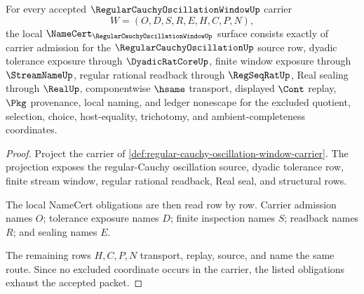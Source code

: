 \begin{theorem}
\label{thm:regular-cauchy-oscillation-window-namecert-obligations}
For every accepted $\RegularCauchyOscillationWindowUp$ carrier
$$
W=(O,D,S,R,E,H,C,P,N),
$$
the local $\NameCert_{\RegularCauchyOscillationWindowUp}$ surface consists exactly of carrier admission for the $\RegularCauchyOscillationUp$ source row, dyadic tolerance exposure through $\DyadicRatCoreUp$, finite window exposure through $\StreamNameUp$, regular rational readback through $\RegSeqRatUp$, Real sealing through $\RealUp$, componentwise $\hsame$ transport, displayed $\Cont$ replay, $\Pkg$ provenance, local naming, and ledger nonescape for the excluded quotient, selection, choice, host-equality, trichotomy, and ambient-completeness coordinates.
\end{theorem}
\begin{proof}
Project the carrier of \autoref{def:regular-cauchy-oscillation-window-carrier}. The projection exposes the regular-Cauchy oscillation source, dyadic tolerance row, finite stream window, regular rational readback, Real seal, and structural rows.

The local NameCert obligations are then read row by row. Carrier admission names $O$; tolerance exposure names $D$; finite inspection names $S$; readback names $R$; and sealing names $E$.

The remaining rows $H,C,P,N$ transport, replay, source, and name the same route. Since no excluded coordinate occurs in the carrier, the listed obligations exhaust the accepted packet.
\end{proof}

